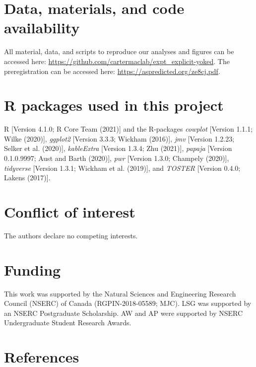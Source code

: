 \documentclass[
  english,
  man,floatsintext]{apa7}
\begin{document}
\hypertarget{data-materials-and-code-availability}{%
\section{Data, materials, and code availability}\label{data-materials-and-code-availability}}

\label{sec:sharing}
All material, data, and scripts to reproduce our analyses and figures can be accessed here: \url{https://github.com/cartermaclab/expt_explicit-yoked}. The preregistration can be accessed here: \url{https://aspredicted.org/ze8cj.pdf}.

\hypertarget{r-packages-used-in-this-project}{%
\section{R packages used in this project}\label{r-packages-used-in-this-project}}

R {[}Version 4.1.0; R Core Team (2021){]} and the R-packages \emph{cowplot} {[}Version 1.1.1; Wilke (2020){]}, \emph{ggplot2} {[}Version 3.3.3; Wickham (2016){]}, \emph{jmv} {[}Version 1.2.23; Selker et al. (2020){]}, \emph{kableExtra} {[}Version 1.3.4; Zhu (2021){]}, \emph{papaja} {[}Version 0.1.0.9997; Aust and Barth (2020){]}, \emph{pwr} {[}Version 1.3.0; Champely (2020){]}, \emph{tidyverse} {[}Version 1.3.1; Wickham et al. (2019){]}, and \emph{TOSTER} {[}Version 0.4.0; Lakens (2017){]}.

\hypertarget{conflict-of-interest}{%
\section{Conflict of interest}\label{conflict-of-interest}}

The authors declare no competing interests.

\hypertarget{funding}{%
\section{Funding}\label{funding}}

This work was supported by the Natural Sciences and Engineering Research Council (NSERC) of Canada (RGPIN-2018-05589; MJC). LSG was supported by an NSERC Postgraduate Scholarship. AW and AP were supported by NSERC Undergraduate Student Research Awards.

\hypertarget{references}{%
\section{References}\label{references}}
\end{document}
